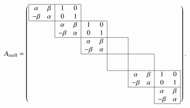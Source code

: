 \begin{equation}
\def\temp#1{\multicolumn{1}{|c}{#1\mathstrut}}
\def\semp#1{\multicolumn{1}{c|}{#1\mathstrut}}
A_{\text{reell}}
=
\left(
\begin{array}{cccccccccccc}
\cline{1-4}
\temp{\alpha}& \beta&\temp{     1}&     0&\temp{}      &      &      &      &      &      &&\\
\temp{-\beta}&\alpha&\temp{     0}&     1&\temp{}      &      &      &      &      &      &&\\
\cline{1-6}
      &      &\temp{\alpha}& \beta&\temp{     1}&     0&\temp{}      &      &      &      &&\\
      &      &\temp{-\beta}&\alpha&\temp{     0}&     1&\temp{}      &      &      &      &&\\
\cline{3-8}
      &      &      &      &\temp{\alpha}& \beta&\temp{}      &      &\temp{}&      &&\\
      &      &      &      &\temp{-\beta}&\alpha&\temp{}      &      &\temp{}&      &&\\
\cline{5-10}
      &      &      &      &      &      &\temp{\phantom{0}}&\phantom{0}&\temp{      }&      &\temp{}&\\
      &      &      &      &      &      &\temp{\phantom{0}}&\phantom{0}&\temp{      }&      &\temp{}&\\
\cline{7-12}
      &      &      &      &      &      &      &      &\temp{\alpha}& \beta&\temp{     1}&\semp{     0}\\
      &      &      &      &      &      &      &      &\temp{-\beta}&\alpha&\temp{     0}&\semp{     1}\\
\cline{9-12}
      &      &      &      &      &      &      &      &      &      &\temp{\alpha}&\semp{ \beta}\\
      &      &      &      &      &      &      &      &      &      &\temp{-\beta}&\semp{\alpha}\\
\cline{11-12}
\end{array}\right).
\label{buch:eigenwerte:eqn:reellenormalform}
\end{equation}

